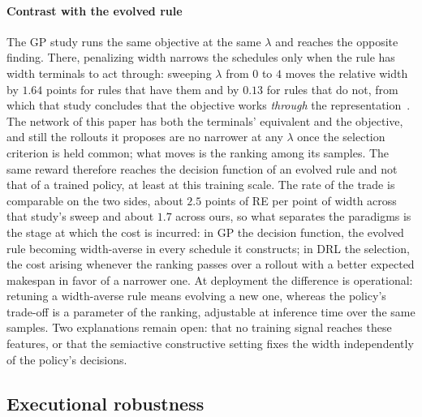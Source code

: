 \documentclass[preprint,12pt]{elsarticle}
\theoremstyle{definition}
\theoremstyle{remark}
\begin{document}
\paragraph{Contrast with the evolved rule} The GP study runs
the same objective at the same $\lambda$ and reaches the opposite
finding. There, penalizing width narrows the schedules only when the
rule has width terminals to act through: sweeping $\lambda$ from $0$
to $4$ moves the relative width by $1.64$ points for rules that have
them and by $0.13$ for rules that do not, from which that study
concludes that the objective works \emph{through} the
representation~\citep{DiazGP2026}. The network of this paper has
both the terminals' equivalent and the objective, and still the
rollouts it proposes are no narrower at any $\lambda$ once the
selection criterion is held common; what moves is the ranking among
its samples. The same reward therefore reaches the decision
function of an evolved rule and not that of a trained policy, at
least at this training scale. The rate of the trade is comparable on
the two sides, about $2.5$ points of RE per point of width across
that study's sweep and about $1.7$ across ours, so what separates
the paradigms is the stage at which the cost is incurred: in GP the
decision function, the evolved rule becoming width-averse in every
schedule it constructs; in DRL the selection, the cost arising
whenever the ranking passes over a rollout with a better expected
makespan in favor of a narrower one. At deployment the difference is
operational: retuning a width-averse rule means evolving a new one,
whereas the policy's trade-off is a parameter of the ranking,
adjustable at inference time over the same samples. Two explanations
remain open: that no training signal reaches these features, or that
the semiactive constructive setting fixes the width independently of
the policy's decisions.

\FloatBarrier
\subsection{Executional robustness}
\label{sec:results-eps}
\end{document}
